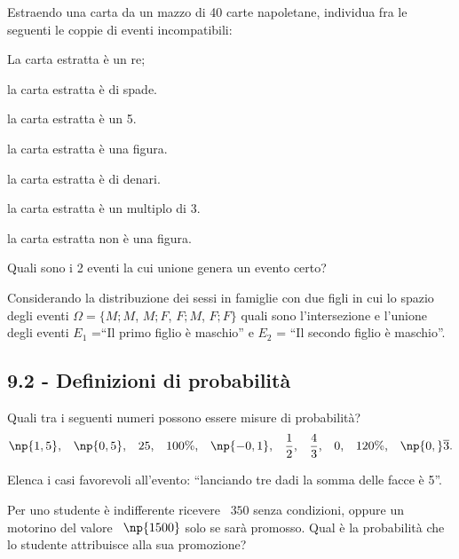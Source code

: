 \begin{esercizio}
 \label{ese:9.3}
Estraendo una carta da un mazzo di 40 carte napoletane, individua fra le seguenti le coppie di eventi incompatibili:
\begin{multicols}{2}
\begin{enumeratea}
\item La carta estratta è un re;
\item la carta estratta è di spade.
\item la carta estratta è un 5.
\item la carta estratta è una figura.
\item la carta estratta è di denari.
\item la carta estratta è un multiplo di 3.
\item la carta estratta non è una figura.
\end{enumeratea}
\end{multicols}
Quali sono i 2 eventi la cui unione genera un evento certo?
\end{esercizio}

\begin{esercizio}
 \label{ese:9.4}
 Considerando la distribuzione dei sessi in famiglie con due figli in cui lo spazio degli eventi $\Omega =\{{M;M}$, ${M;F}$, ${F;M}$, ${F;F}\}$ quali sono l'intersezione e l'unione degli eventi $E_1$ =``Il primo figlio è maschio'' e $E_2$ = ``Il secondo figlio è maschio''.
\end{esercizio}

\subsection*{9.2 - Definizioni di probabilità}

\begin{esercizio}
 \label{ese:9.5}
Quali tra i seguenti numeri possono essere misure di probabilità? \[ \np{1,5}\text{,}\quad\np{0,5}\text{,}\quad 25\text{,}\quad 100\%\text{,}\quad\np{-0,1}\text{,}\quad\frac 1 2\text{,}\quad\frac 4 3\text{,}\quad 0\text{,}\quad 120\%\text{,}\quad\np{0,}\overline{3}. \]
\end{esercizio}

\begin{esercizio}
 \label{ese:9.6}
Elenca i casi favorevoli all'evento: ``lanciando tre dadi la somma delle facce è 5''.
\end{esercizio}

\begin{esercizio}[\Ast]
 \label{ese:9.7}
Per uno studente è indifferente ricevere \officialeuro~$350$ senza condizioni, oppure un motorino del valore \officialeuro~$\np{1500}$ solo se sarà promosso. Qual è la probabilità che lo studente attribuisce alla sua promozione?
\end{esercizio}

